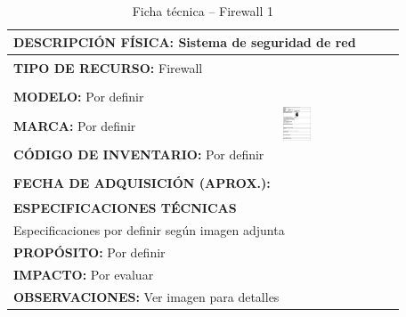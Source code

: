 \begin{table}[H]
\centering
\caption{Ficha técnica -- Firewall 1}
\label{tab:firewall-1}
\begin{tabular}{|p{}|p{}|}
\hline
\multicolumn{2}{|l|}{\textbf{DESCRIPCIÓN FÍSICA:} Sistema de seguridad de red} \\ \hline
\textbf{TIPO DE RECURSO:} Firewall & 
\multirow{5}{*}{\includegraphics[width=0.25\textwidth,height=4cm,keepaspectratio]{tablas-images/cp1/firewall/firewall.png}} \\ \cline{1-1}
\textbf{MODELO:} Por definir & \\ \cline{1-1}
\textbf{MARCA:} Por definir & \\ \cline{1-1}
\textbf{CÓDIGO DE INVENTARIO:} Por definir & \\ \cline{1-1}
\textbf{FECHA DE ADQUISICIÓN (APROX.):} & \\ \hline
\multicolumn{2}{|l|}{\textbf{ESPECIFICACIONES TÉCNICAS}} \\ \hline
\multicolumn{2}{|p{0.95\textwidth}|}{
\footnotesize
Especificaciones por definir según imagen adjunta
} \\ \hline
\multicolumn{2}{|l|}{\textbf{PROPÓSITO:} Por definir} \\ \hline
\multicolumn{2}{|l|}{\textbf{IMPACTO:} Por evaluar} \\ \hline
\multicolumn{2}{|l|}{\textbf{OBSERVACIONES:} Ver imagen para detalles} \\ \hline
\end{tabular}
\end{table}